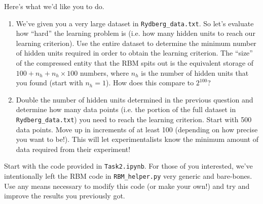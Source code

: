\documentclass[12pt]{article}
\begin{document}
Here's what we'd like you to do.
\begin{enumerate}
    \item We've given you a very large dataset in \texttt{Rydberg\_data.txt}. So let's evaluate how ``hard'' the learning problem is (i.e. how many hidden units to reach our learning criterion). Use the entire dataset to determine the minimum number of hidden units required in order to obtain the learning criterion. The ``size'' of the compressed entity that the RBM spits out is the equivalent storage of $100 + n_h + n_h \times 100$ numbers, where $n_h$ is the number of hidden units that you found (start with $n_h = 1$). How does this compare to $2^{100}$? 
    \item Double the number of hidden units determined in the previous question and determine how many data points (i.e. the portion of the full dataset in \texttt{Rydberg\_data.txt}) you need to reach the learning criterion. Start with 500 data points. Move up in increments of at least 100 (depending on how precise you want to be!). This will let experimentalists know the minimum amount of data required from their experiment!
\end{enumerate}

Start with the code provided in \texttt{Task2.ipynb}. For those of you interested, we've intentionally left the RBM code in \texttt{RBM\_helper.py} very generic and bare-bones. Use any means necessary to modify this code (or make your own!) and try and improve the results you previously got.



\end{document}
